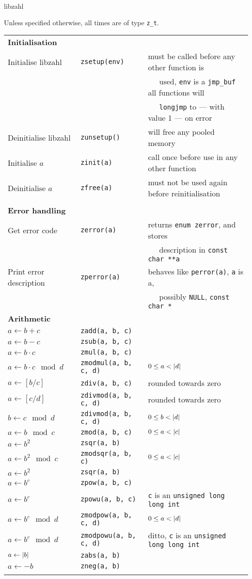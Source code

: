 \documentclass[10pt,draft]{article}
\DeclarePairedDelimiter\ab{\lvert}{\rvert}
\newcommand{\ullong}{{\tt unsigned long long int}}
\newcommand{\entry}[3]{ #2 & {\tt #1} & #3 \\ }
\newcommand{\entrycont}[1]{ & & $~~~~~$ #1 \\ }
\newcommand{\entryTwo}[4]{\entry{#1}{#2}{#3}\entrycont{#4}}
\newcommand{\entryThree}[5]{\entryTwo{#1}{#2}{#3}{#4}\entrycont{#5}}
\begin{document}
{\Huge libzahl}
\vspace{1ex}

Unless specified otherwise, all times are of type {\tt z\_t}.
\vspace{1.5em}



\hspace{-0.8em}
\begin{tabular}{lll}



\textbf{Initialisation} \\
\entryThree{zsetup(env)} {Initialise libzahl}   {must be called before any other function is}
                                                {used, {\tt env} is a {\tt jmp\_buf} all functions will}
                                                {{\tt longjmp} to --- with value 1 --- on error}
\entry     {zunsetup()}  {Deinitialise libzahl} {will free any pooled memory}
\entry     {zinit(a)}    {Initialise $a$}       {call once before use in any other function}
\entry     {zfree(a)}    {Deinitialise $a$}     {must not be used again before reinitialisation}
\\

\textbf{Error handling} \\
\entryTwo{zerror(a)}  {Get error code}          {returns {\tt enum zerror}, and stores}
                                                {description in {\tt const char **a}}
\entryTwo{zperror(a)} {Print error description} {behaves like {\tt perror(a)}, {\tt a} is a,}
                                                {possibly {\tt NULL}, {\tt const char *}}

\textbf{Arithmetic} \\
\entry{zadd(a, b, c)}        {$a \gets b + c$}            {}
\entry{zsub(a, b, c)}        {$a \gets b - c$}            {}
\entry{zmul(a, b, c)}        {$a \gets b \cdot c$}        {}
\entry{zmodmul(a, b, c, d)}  {$a \gets b \cdot c \mod d$} {$0 \le a < \ab{d}$}
\entry{zdiv(a, b, c)}        {$a \gets [b / c]$}          {rounded towards zero}
\entry{zdivmod(a, b, c, d)}  {$a \gets [c / d]$}          {rounded towards zero}
\entry{zdivmod(a, b, c, d)}  {$b \gets c \mod d$}         {$0 \le b < \ab{d}$}
\entry{zmod(a, b, c)}        {$a \gets b \mod c$}         {$0 \le a < \ab{c}$}
\entry{zsqr(a, b)}           {$a \gets b^2$}              {}
\entry{zmodsqr(a, b, c)}     {$a \gets b^2 \mod c$}       {$0 \le a < \ab{c}$}
\entry{zsqr(a, b)}           {$a \gets b^2$}              {}
\entry{zpow(a, b, c)}        {$a \gets b^c$}              {}
\entry{zpowu(a, b, c)}       {$a \gets b^c$}              {{\tt c} is an \ullong{}}
\entry{zmodpow(a, b, c, d)}  {$a \gets b^c \mod d$}       {$0 \le a < \ab{d}$}
\entry{zmodpowu(a, b, c, d)} {$a \gets b^c \mod d$}       {ditto, {\tt c} is an \ullong{}}
\entry{zabs(a, b)}           {$a \gets \ab{b}$}           {}
\entry{zneg(a, b)}           {$a \gets -b$}               {}
\\


\end{tabular}
\end{document}
